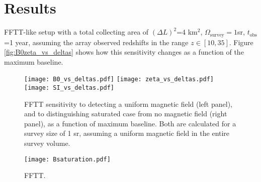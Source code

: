 \section{Results}
\label{sec:results}

FFTT-like setup with a total collecting area of $(\Delta L)^2$=4 km$^2$, $\Omega_\text{survey}=1$sr, $t_\text{obs}$=1 year, assuming the array observed redshifts in the range $z\in [10,35]$. Figure \ref{fig:B0zeta_vs_deltas} shows how this sensitivity changes as a function of the maximum baseline.
\begin{figure}
\centering
\texttt{[image: B0\_vs\_deltas.pdf]}
\texttt{[image: zeta\_vs\_deltas.pdf]}
\texttt{[image: SI\_vs\_deltas.pdf]}
\caption{FFTT sensitivity to detecting a uniform magnetic field (left panel), and to distinguishing saturated case from no magnetic field (right panel), as a function of maximum baseline. Both are calculated for a survey size of 1 sr, assuming a uniform magnetic field in the entire survey volume.\label{fig:B0zetaSI_vs_deltas}}
\end{figure}
\begin{figure}
\centering
\texttt{[image: Bsaturation.pdf]}
\caption{FFTT.\label{fig:Bsat}}
\end{figure}